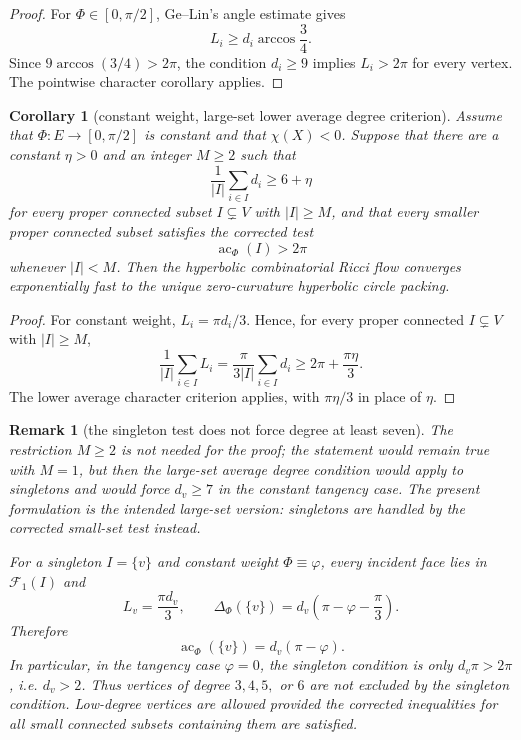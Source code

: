 \documentclass[11pt]{article}
\newtheorem{corollary}[theorem]{Corollary}
\newtheorem{remark}[theorem]{Remark}
\newcommand{\Phiw}{\Phi}
\newcommand{\ac}{\operatorname{ac}}
\begin{document}
\begin{proof}
For $\Phiw\in[0,\pi/2]$, Ge--Lin's angle estimate gives
\[
  L_i\ge d_i\arccos\frac34.
\]
Since $9\arccos(3/4)>2\pi$, the condition $d_i\ge9$ implies
$L_i>2\pi$ for every vertex.  The pointwise character corollary applies.
\end{proof}

\begin{corollary}[constant weight, large-set lower average degree criterion]
Assume that $\Phiw:E\to[0,\pi/2]$ is constant and that $\chi(X)<0$.
Suppose that there are a constant $\eta>0$ and an integer $M\ge2$ such that
\[
  \frac1{|I|}\sum_{i\in I}d_i \ge 6+\eta
\]
for every proper connected subset $I\subsetneq V$ with $|I|\ge M$, and
that every smaller proper connected subset satisfies the corrected test
\[
  \ac_\Phi(I)>2\pi
\]
whenever $|I|<M$.  Then the hyperbolic combinatorial Ricci flow converges
exponentially fast to the unique zero-curvature hyperbolic circle packing.
\end{corollary}

\begin{proof}
For constant weight, $L_i=\pi d_i/3$.  Hence, for every proper connected
$I\subsetneq V$ with $|I|\ge M$,
\[
  \frac1{|I|}\sum_{i\in I}L_i
  =
  \frac{\pi}{3|I|}\sum_{i\in I}d_i
  \ge
  2\pi+\frac{\pi\eta}{3}.
\]
The lower average character criterion applies, with $\pi\eta/3$ in place
of $\eta$.
\end{proof}

\begin{remark}[the singleton test does not force degree at least seven]
The restriction $M\ge2$ is not needed for the proof; the statement would
remain true with $M=1$, but then the large-set average degree condition
would apply to singletons and would force $d_v\ge7$ in the constant
tangency case.  The present formulation is the intended large-set version:
singletons are handled by the corrected small-set test instead.

For a singleton $I=\{v\}$ and constant weight $\Phiw\equiv\varphi$, every
incident face lies in $\mathcal F_1(I)$ and
\[
  L_v=\frac{\pi d_v}{3},\qquad
  \Delta_\Phi(\{v\})
  =
  d_v\left(\pi-\varphi-\frac{\pi}{3}\right).
\]
Therefore
\[
  \ac_\Phi(\{v\})=d_v(\pi-\varphi).
\]
In particular, in the tangency case $\varphi=0$, the singleton condition is
only $d_v\pi>2\pi$, i.e. $d_v>2$.  Thus vertices of degree $3,4,5,$ or $6$
are not excluded by the singleton condition.  Low-degree vertices are
allowed provided the corrected inequalities for all small connected
subsets containing them are satisfied.
\end{remark}
\end{document}

